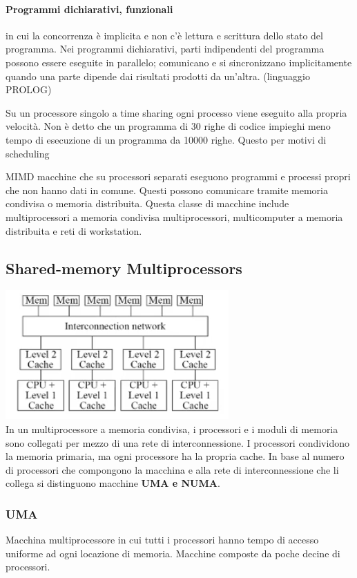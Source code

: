 \documentclass[10pt,a4paper]{book}
\begin{document}
\paragraph{Programmi dichiarativi, funzionali}
in cui la concorrenza è implicita e non c'è lettura e scrittura dello stato del programma. Nei programmi dichiarativi, parti indipendenti del programma possono essere eseguite in parallelo; comunicano e si sincronizzano implicitamente quando una parte dipende dai risultati prodotti da un'altra. (linguaggio PROLOG)

Su un processore singolo a time sharing ogni processo viene eseguito alla propria velocità. Non è detto che un programma di 30 righe di codice impieghi meno tempo di esecuzione di un programma da 10000 righe. Questo per motivi di scheduling

MIMD macchine che su processori separati eseguono programmi e processi propri che non hanno dati in comune. Questi possono comunicare tramite memoria condivisa o memoria distribuita.
Questa classe di macchine include multiprocessori a memoria condivisa multiprocessori, multicomputer a memoria distribuita e reti di workstation.

\subsection{Shared-memory Multiprocessors}
\includegraphics[scale=1]{img/sharedmem.png} \\
In un multiprocessore a memoria condivisa, i processori e i moduli di memoria sono collegati per mezzo di una rete di interconnessione. I processori condividono la memoria primaria, ma ogni processore ha la propria cache.
In base al numero di processori che compongono la macchina e alla rete di interconnessione che li collega si distinguono macchine \textbf{UMA e NUMA}.
\subsubsection{UMA} Macchina multiprocessore in cui tutti i processori hanno tempo di accesso uniforme ad ogni locazione di memoria.
Macchine composte da poche decine di processori.
\end{document}
